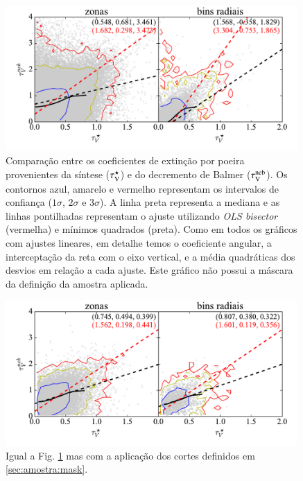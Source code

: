 \begin{figure}
	\centering
	\includegraphics[width=0.99\textwidth]{figuras/CompareTauV.pdf}
	\caption[Comparação entre os coeficientes de extinção.] 
	{Comparação entre os coeficientes de extinção por poeira provenientes da síntese ($\tau_{\mathrm{V}}^\star$) e
do decremento de Balmer ($\tau_{\mathrm{V}}^{\mathrm{neb}}$). Os contornos azul, amarelo e vermelho representam os
intervalos de confiança ($1\sigma$, $2\sigma$ e $3\sigma$). A linha preta representa a mediana e as linhas
pontilhadas representam o ajuste utilizando {\em OLS bisector} (vermelha) e mínimos quadrados
(preta). Como em todos os gráficos com ajustes lineares, em detalhe temos o coeficiente angular, a
interceptação da reta com o eixo vertical, e a média quadráticas dos desvios em relação a cada
ajuste. Este gráfico não possui a máscara da definição da amostra aplicada.}
	\label{fig:tauVsynvsneb}
\end{figure}

\begin{figure}
	\centering
	\includegraphics[width=0.99\textwidth]{figuras/CompareTauV_realsample.pdf}
	\caption[Comparação entre os coeficientes de extinção (com máscara).]
	{Igual a Fig. \ref{fig:tauVsynvsneb} mas com a aplicação dos cortes definidos em
\ref{sec:amostra:mask}.} 
	\label{fig:tauVsynvsnebMask}
\end{figure}

